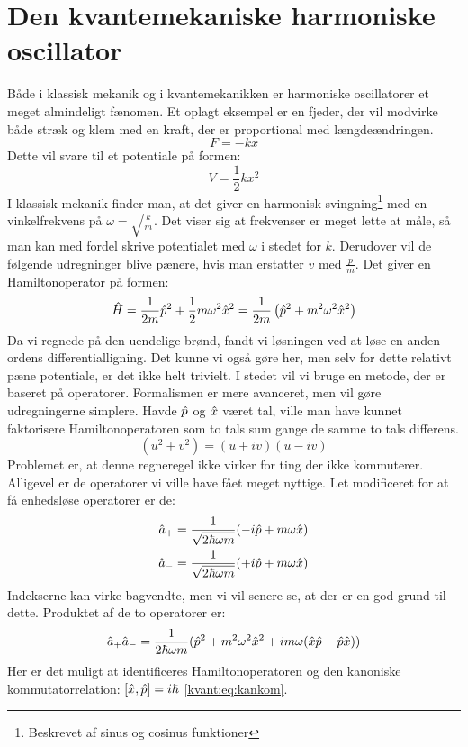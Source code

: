 \documentclass[../Kvantemekanik.tex]{subfiles}
\begin{document}
\section{Den kvantemekaniske harmoniske oscillator}
Både i klassisk mekanik og i kvantemekanikken er harmoniske oscillatorer et meget almindeligt fænomen.
Et oplagt eksempel er en fjeder, der vil modvirke både stræk og klem med en kraft, der er proportional med længdeændringen.
$$
F = -kx
$$
Dette vil svare til et potentiale på formen:
\begin{equation}
V=\frac{1}{2}kx^2
\end{equation}
I klassisk mekanik finder man, at det giver en harmonisk svingning\footnote{Beskrevet af sinus og cosinus funktioner} med en vinkelfrekvens på $\omega = \sqrt{\frac{k}{m}}$. Det viser sig at frekvenser er meget lette at måle, så man kan med fordel skrive potentialet med $\omega$ i stedet for $k$. Derudover vil de følgende udregninger blive pænere, hvis man erstatter $v$ med $\frac{p}{m}$. Det giver en Hamiltonoperator på formen:
\begin{equation}
\hat H = \frac{1}{2m}\hat p^2+\frac{1}{2} m\omega^2\hat x^2
=
\frac{1}{2m}\left(\hat p^2 + m^2\omega^2\hat x^2\right)
\end{equation}
Da vi regnede på den uendelige brønd, fandt vi løsningen ved at løse en anden ordens differentialligning. Det kunne vi også gøre her, men selv for dette relativt pæne potentiale, er det ikke helt trivielt. I stedet vil vi bruge en metode, der er baseret på operatorer. Formalismen er mere avanceret, men vil gøre udregningerne simplere.
Havde $\hat p$ og $\hat x$ været tal, ville man have kunnet faktorisere Hamiltonoperatoren som to tals sum gange de samme to tals differens.
$$
(u^2+v^2) = (u+iv)(u-iv)
$$
Problemet er, at denne regneregel ikke virker for ting der ikke kommuterer.
Alligevel er de operatorer vi ville have fået meget nyttige. Let modificeret for at få enhedsløse operatorer er de:
\begin{align}
\hat a_+ &= \frac{1}{\sqrt{2\hbar \omega m}}(-i\hat p+m\omega \hat x)\label{kvant:eq:ahigher}\\
\hat a_- &= \frac{1}{\sqrt{2\hbar \omega m}}(+i\hat p+m\omega \hat x)\label{kvant:eq:alower}
\end{align}
Indekserne kan virke bagvendte, men vi vil senere se, at der er en god grund til dette.
Produktet af de to operatorer er:
$$
\hat a_+ \hat a_- = \frac{1}{2\hbar \omega m}(\hat p^2+m^2\omega^2\hat x^2+im\omega (\hat x\hat p -  \hat p \hat x))
$$
Her er det muligt at identificeres Hamiltonoperatoren og den kanoniske kommutatorrelation: $[\hat x , \hat p] = i\hbar$ \eqref{kvant:eq:kankom}.
\end{document}
